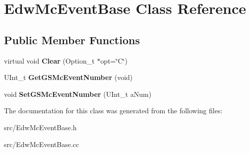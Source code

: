 \hypertarget{class_edw_mc_event_base}{
\section{EdwMcEventBase Class Reference}
\label{class_edw_mc_event_base}
}
\subsection*{Public Member Functions}
\begin{DoxyCompactItemize}
\item 
\hypertarget{class_edw_mc_event_base_a4e43b675ec4c28a532a73caa94ae58fb}{
virtual void {\bfseries Clear} (Option\_\-t $\ast$opt=\char`\"{}C\char`\"{})}
\label{class_edw_mc_event_base_a4e43b675ec4c28a532a73caa94ae58fb}

\item 
\hypertarget{class_edw_mc_event_base_a4cebfc91b0753c4bb314958086762cf8}{
UInt\_\-t {\bfseries GetGSMcEventNumber} (void)}
\label{class_edw_mc_event_base_a4cebfc91b0753c4bb314958086762cf8}

\item 
\hypertarget{class_edw_mc_event_base_a49fbcc63d486208996b6207922693567}{
void {\bfseries SetGSMcEventNumber} (UInt\_\-t aNum)}
\label{class_edw_mc_event_base_a49fbcc63d486208996b6207922693567}

\end{DoxyCompactItemize}


The documentation for this class was generated from the following files:\begin{DoxyCompactItemize}
\item 
src/EdwMcEventBase.h\item 
src/EdwMcEventBase.cc\end{DoxyCompactItemize}
